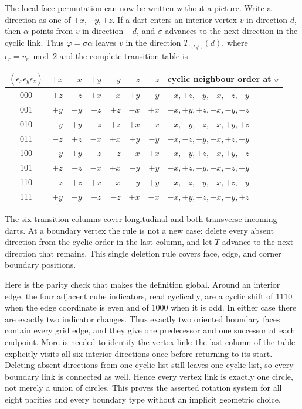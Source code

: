 \documentclass[11pt]{article}
\begin{document}
The local face permutation can now be written without a picture.  Write a
direction as one of \(\pm x,\pm y,\pm z\).  If a dart enters an interior
vertex \(v\) in direction \(d\), then \(\alpha\) points from \(v\) in
direction \(-d\), and \(\sigma\) advances to the next direction in the
cyclic link.  Thus \(\varphi=\sigma\alpha\) leaves \(v\) in the direction
\(T_{\epsilon_x\epsilon_y\epsilon_z}(d)\), where
\(\epsilon_r=v_r\bmod2\) and the complete transition table is
\begin{center}
\scriptsize
\begin{tabular}{c|rrrrrr|l}
\toprule
\((\epsilon_x\epsilon_y\epsilon_z)\)&\(+x\)&\(-x\)&\(+y\)&\(-y\)&\(+z\)&\(-z\)
& cyclic neighbour order at \(v\)\\
\midrule
000&\(+z\)&\(-z\)&\(+x\)&\(-x\)&\(+y\)&\(-y\)&
\(-x,+z,-y,+x,-z,+y\)\\
001&\(+y\)&\(-y\)&\(-z\)&\(+z\)&\(-x\)&\(+x\)&
\(-x,+y,+z,+x,-y,-z\)\\
010&\(-y\)&\(+y\)&\(-z\)&\(+z\)&\(+x\)&\(-x\)&
\(-x,-y,-z,+x,+y,+z\)\\
011&\(-z\)&\(+z\)&\(-x\)&\(+x\)&\(+y\)&\(-y\)&
\(-x,-z,+y,+x,+z,-y\)\\
100&\(-y\)&\(+y\)&\(+z\)&\(-z\)&\(-x\)&\(+x\)&
\(-x,-y,+z,+x,+y,-z\)\\
101&\(+z\)&\(-z\)&\(-x\)&\(+x\)&\(-y\)&\(+y\)&
\(-x,+z,+y,+x,-z,-y\)\\
110&\(-z\)&\(+z\)&\(+x\)&\(-x\)&\(-y\)&\(+y\)&
\(-x,-z,-y,+x,+z,+y\)\\
111&\(+y\)&\(-y\)&\(+z\)&\(-z\)&\(+x\)&\(-x\)&
\(-x,+y,-z,+x,-y,+z\)\\
\bottomrule
\end{tabular}
\end{center}
The six transition columns cover longitudinal and both transverse incoming
darts.  At a boundary vertex the rule is not a new case: delete every absent
direction from the cyclic order in the last column, and let \(T\) advance to
the next direction that remains.  This single deletion rule covers face,
edge, and corner boundary positions.

Here is the parity check that makes the definition global.  Around an
interior edge, the four adjacent cube indicators, read cyclically, are a
cyclic shift of \(1110\) when the edge coordinate is even and of \(1000\)
when it is odd.  In either case there are exactly two indicator changes.
Thus exactly two oriented boundary faces contain every grid edge, and they
give one predecessor and one successor at each endpoint.  More is needed to
identify the vertex link: the last column of the table explicitly visits all
six interior directions once before returning to its start.  Deleting absent
directions from one cyclic list still leaves one cyclic list, so every
boundary link is connected as well.  Hence every vertex link is exactly one
circle, not merely a union of circles.  This proves the asserted rotation
system for all eight parities and every boundary type without an implicit
geometric choice.
\end{document}
